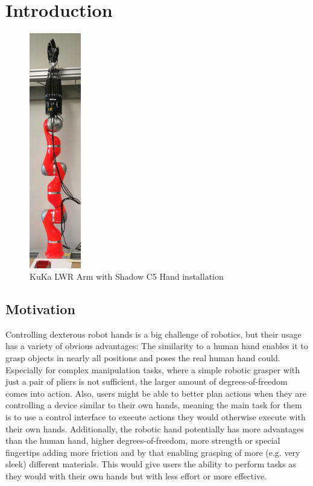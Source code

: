 \chapter{Introduction}

\begin{figure}
	\caption{KuKa LWR Arm with Shadow C5 Hand installation\label{fig:armwithhand}}
	\includegraphics[width=0.2\textwidth]{assets/chpt_intro/lwr_c5hand.jpg}
\end{figure}

\section{Motivation}

Controlling dexterous robot hands is a big challenge of robotics, but their usage has a variety of obvious advantages: The similarity to a human hand enables it to grasp objects in nearly all positions and poses the real human hand could. Especially for complex manipulation tasks, where a simple robotic grasper with just a pair of pliers is not sufficient, the larger amount of degrees-of-freedom comes into action. Also, users might be able to better plan actions when they are controlling a device similar to their own hands, meaning the main task for them is to use a control interface to execute actions they would otherwise execute with their own hands. Additionally, the robotic hand potentially has more advantages than the human hand, higher degrees-of-freedom, more strength or special fingertips adding more friction and by that enabling grasping of more (e.g. very sleek) different materials. This would give users the ability to perform tasks as they would with their own hands but with less effort or more effective.

